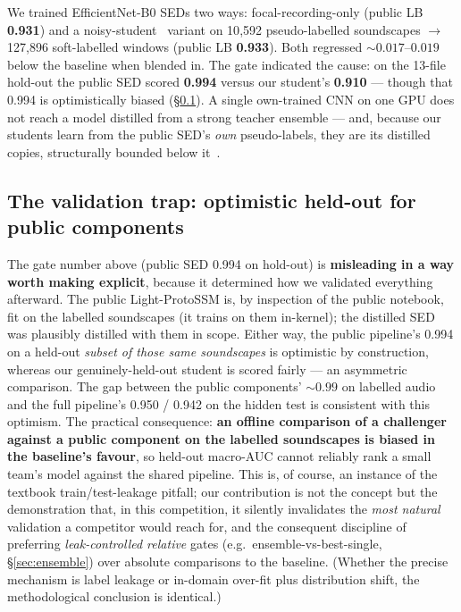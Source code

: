 \documentclass{ceurart}
\begin{document}
We trained EfficientNet-B0 SEDs two ways: focal-recording-only (public LB
\textbf{0.931}) and a noisy-student~\cite{noisystudent} variant on 10{,}592
pseudo-labelled soundscapes $\to$ 127{,}896 soft-labelled windows (public LB
\textbf{0.933}). Both regressed ${\sim}0.017$--$0.019$ below the baseline when
blended in. The gate indicated the cause: on the 13-file hold-out the public
SED scored \textbf{0.994} versus our student's \textbf{0.910} --- though that 0.994
is optimistically biased (\S\ref{sec:trap}). A single own-trained CNN on one GPU
does not reach a model distilled from a strong teacher ensemble --- and, because
our students learn from the public SED's \emph{own} pseudo-labels, they are its
distilled copies, structurally bounded below it~\cite{distillation}.

\subsection{The validation trap: optimistic held-out for public components}
\label{sec:trap}

The gate number above (public SED 0.994 on hold-out) is \textbf{misleading in a way
worth making explicit}, because it determined how we validated everything
afterward. The public Light-ProtoSSM is, by inspection of the public notebook, fit
on the labelled soundscapes (it trains on them in-kernel); the distilled SED was
plausibly distilled with them in scope. Either way, the public pipeline's 0.994 on
a held-out \emph{subset of those same soundscapes} is optimistic by construction,
whereas our genuinely-held-out student is scored fairly --- an asymmetric
comparison. The gap between the public components' ${\sim}0.99$ on labelled audio
and the full pipeline's 0.950 / 0.942 on the hidden test is consistent with this
optimism. The practical consequence: \textbf{an offline comparison of a challenger
against a public component on the labelled soundscapes is biased in the baseline's
favour}, so held-out macro-AUC cannot reliably rank a small team's model against
the shared pipeline. This is, of course, an instance of the textbook
train/test-leakage pitfall; our contribution is not the concept but the
demonstration that, in this competition, it silently invalidates the \emph{most
natural} validation a competitor would reach for, and the consequent discipline of
preferring \emph{leak-controlled relative} gates (e.g.\ ensemble-vs-best-single,
\S\ref{sec:ensemble}) over absolute comparisons to the baseline. (Whether the
precise mechanism is label leakage or in-domain over-fit plus distribution shift,
the methodological conclusion is identical.)
\end{document}
